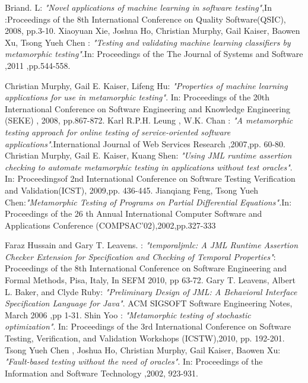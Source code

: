 \begin{thebibliography}{99}
\label{Bibliography}


Briand. L:
{\it{"Novel applications of machine learning in software testing"}},In :Proceedings of the 8th International Conference on Quality Software(QSIC), 2008, pp.3-10.
Xiaoyuan Xie, Joshua Ho, Christian Murphy, Gail Kaiser, Baowen Xu, Tsong Yueh Chen :
{\it{"Testing and validating machine learning classifiers by metamorphic testing"}}.In: Proceedings of the The Journal of Systems and Software  ,2011 ,pp.544-558.

Christian Murphy, Gail E. Kaiser, Lifeng Hu:
{\it{"Properties of machine learning applications for use in metamorphic testing"}}. In: Proceedings of the 20th International Conference on Software Engineering and Knowledge Engineering (SEKE) , 2008, pp.867-872.
Karl R.P.H. Leung , W.K. Chan :
{\it{"A metamorphic testing approach for online testing of service-oriented software applications"}}.International Journal of Web Services Research ,2007,pp. 60-80.
Christian Murphy, Gail E. Kaiser, Kuang Shen:
{\it{"Using JML runtime assertion checking to automate metamorphic testing in applications without test oracles"}}. In: Proceedingsof 2nd International Conference on Software Testing Verification and Validation(ICST), 2009,pp. 436-445.
Jianqiang Feng, Tsong Yueh Chen:{\it{"Metamorphic Testing of Programs on Partial Differential Equations".}}In: Proceedings of the 26 th Annual International Computer Software and Applications Conference (COMPSAC'02),2002,pp.327-333

Faraz Hussain and Gary T. Leavens. :
{\it{"temporaljmlc: A JML Runtime Assertion Checker Extension for Specification and Checking of Temporal Properties"}}: Proceedings of the 8th International Conference on Software Engineering and Formal Methods, Pisa, Italy, In SEFM 2010, pp 63-72.
Gary T. Leavens, Albert L. Baker, and Clyde Ruby:
{\it{"Preliminary Design of JML: A Behavioral Interface Specification Language for Java"}}. ACM SIGSOFT Software Engineering Notes, March 2006 ,pp 1-31.
 Shin Yoo :
{\it{"Metamorphic testing of stochastic optimization"}}. In: Proceedings of the 3rd International Conference on Software Testing, Verification, and Validation Workshops (ICSTW),2010, pp. 192-201.
Tsong Yueh Chen , Joshua Ho, Christian Murphy, Gail Kaiser, Baowen Xu:
{\it{ "Fault-based testing without the need of oracles"}}. In: Proceedings of the Information and Software Technology ,2002, 923-931.


\end{thebibliography}
